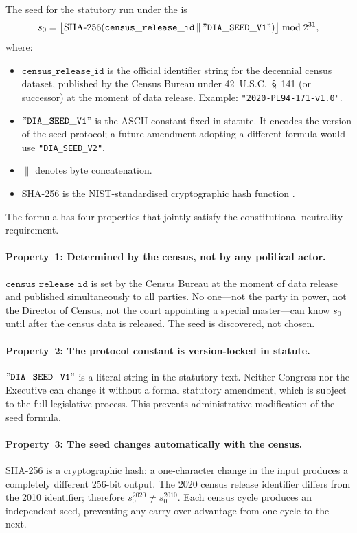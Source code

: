 \begin{definition}
\label{def:diav1}
The seed for the statutory \cs{} run under the \dia{} is
\[
  s_0 = \bigl\lfloor
    \mathrm{SHA\text{-}256}(\mathtt{census\_release\_id}
      \,\|\, \mathtt{"DIA\_SEED\_V1"})
  \bigr\rfloor \bmod 2^{31},
\]
where:
\begin{itemize}
\item $\mathtt{census\_release\_id}$ is the official identifier string for the
      decennial census dataset, published by the Census Bureau under
      42~U.S.C.~\S{}~141 (or successor) at the moment of data release.
      Example: \texttt{"2020-PL94-171-v1.0"}.
\item $\mathtt{"DIA\_SEED\_V1"}$ is the ASCII constant fixed in statute.
      It encodes the version of the seed protocol; a future \dia{} amendment
      adopting a different formula would use \texttt{"DIA\_SEED\_V2"}.
\item $\|$ denotes byte concatenation.
\item SHA-256 is the NIST-standardised cryptographic hash function
      \citep{sha256nist}.
\end{itemize}
\end{definition}

The formula has four properties that jointly satisfy the constitutional
neutrality requirement.

\paragraph{Property~1: Determined by the census, not by any political actor.}
$\mathtt{census\_release\_id}$ is set by the Census Bureau at the moment of
data release and published simultaneously to all parties.
No one---not the party in power, not the Director of Census, not the court
appointing a special master---can know $s_0$ until after the census data is
released.
The seed is discovered, not chosen.

\paragraph{Property~2: The protocol constant is version-locked in statute.}
$\mathtt{"DIA\_SEED\_V1"}$ is a literal string in the statutory text.
Neither Congress nor the Executive can change it without a formal statutory
amendment, which is subject to the full legislative process.
This prevents administrative modification of the seed formula.

\paragraph{Property~3: The seed changes automatically with the census.}
SHA-256 is a cryptographic hash: a one-character change in the input produces
a completely different 256-bit output.
The 2020 census release identifier differs from the 2010 identifier; therefore
$s_0^{2020} \ne s_0^{2010}$.
Each census cycle produces an independent seed, preventing any carry-over
advantage from one cycle to the next.

